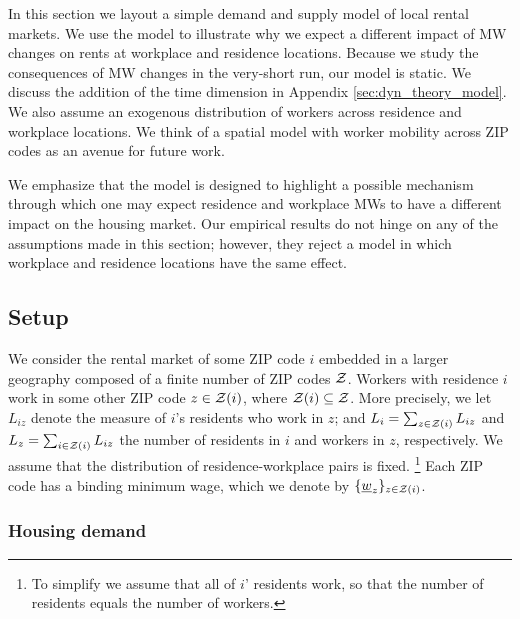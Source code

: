 
In this section we layout a simple demand and supply model of local rental markets.
We use the model to illustrate why we expect a different impact of MW changes 
on rents at workplace and residence locations.
Because we study the consequences of MW changes in the very-short run, our model is 
static.
We discuss the addition of the time dimension in Appendix \ref{sec:dyn_theory_model}.
We also assume an exogenous distribution of workers across residence and workplace 
locations.
We think of a spatial model with worker mobility across ZIP codes as an avenue 
for future work.

We emphasize that the model is designed to highlight a possible mechanism through 
which one may expect residence and workplace MWs to have a different impact on the 
housing market.
Our empirical results do not hinge on any of the assumptions made in this section;
however, they reject a model in which workplace and residence locations have the 
same effect.

\subsection{Setup}

We consider the rental market of some ZIP code $i$ embedded in a larger geography 
composed of a finite number of ZIP codes $\mathcal{Z}$.
Workers with residence $i$ work in some other ZIP code $z\in\mathcal{Z}(i)$, where 
$\mathcal{Z}(i)\subseteq\mathcal{Z}$.
More precisely, we let $L_{iz}$ denote the measure of $i$'s residents who work in 
$z$; and 
$L_i = \sum_{z \in \mathcal{Z}(i)} L_{iz}$ and $L_z = \sum_{i \in \mathcal{Z}(i)} L_{iz}$ the number
of residents in $i$ and workers in $z$, respectively.
We assume that the distribution of residence-workplace pairs is fixed.%
\footnote{To simplify we assume that all of $i$' residents work, so that the number
of residents equals the number of workers.}
Each ZIP code has a binding minimum wage, which we denote by $\{\underline{w}_z\}_{z\in\mathcal{Z}(i)}$.

\subsubsection*{Housing demand}

